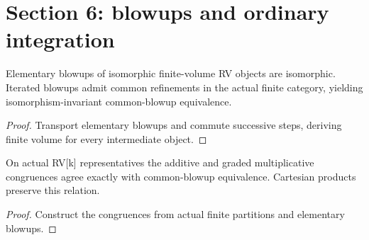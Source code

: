 \section{Section 6: blowups and ordinary integration}


\begin{lemma}

\label{s6-confluence}


\leanok

Elementary blowups of isomorphic finite-volume RV objects are isomorphic. Iterated blowups admit common refinements in the actual finite category, yielding isomorphism-invariant common-blowup equivalence.

\end{lemma}

\begin{proof}


\leanok

Transport elementary blowups and commute successive steps, deriving finite volume for every intermediate object.

\end{proof}

\begin{lemma}

\label{s6-congruence}


\leanok

On actual RV[k] representatives the additive and graded multiplicative congruences agree exactly with common-blowup equivalence. Cartesian products preserve this relation.

\end{lemma}

\begin{proof}


\leanok

Construct the congruences from actual finite partitions and elementary blowups.

\end{proof}


